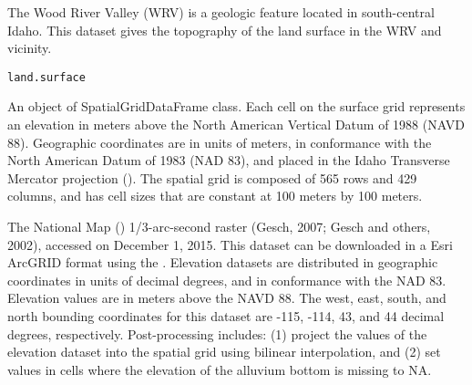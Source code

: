 \documentclass[a4paper]{book}
\begin{document}
%
\begin{Examples}
\end{Examples}
%
\begin{Description}\relax
The Wood River Valley (WRV) is a geologic feature located in south-central Idaho.
This dataset gives the topography of the land surface in the WRV and vicinity.
\end{Description}
%
\begin{Usage}
\begin{verbatim}
land.surface
\end{verbatim}
\end{Usage}
%
\begin{Format}
An object of SpatialGridDataFrame class.
Each cell on the surface grid represents an elevation in meters above the
North American Vertical Datum of 1988 (NAVD 88).
Geographic coordinates are in units of meters, in conformance with the
North American Datum of 1983 (NAD 83), and placed in the
Idaho Transverse Mercator projection ().
The spatial grid is composed of 565 rows and 429 columns,
and has cell sizes that are constant at 100 meters by 100 meters.
\end{Format}
%
\begin{Source}\relax
The National Map ()
1/3-arc-second raster (Gesch, 2007; Gesch and others, 2002),
accessed on December 1, 2015.
This dataset can be downloaded in a Esri ArcGRID format using the
.
Elevation datasets are distributed in geographic coordinates in units of decimal degrees,
and in conformance with the NAD 83.
Elevation values are in meters above the NAVD 88.
The west, east, south, and north bounding coordinates for this dataset are
-115, -114, 43, and 44 decimal degrees, respectively.
Post-processing includes:
(1) project the values of the elevation dataset into the 
spatial grid using bilinear interpolation, and
(2) set values in cells where the elevation of the alluvium bottom is missing to NA.
\end{Source}
\end{document}
